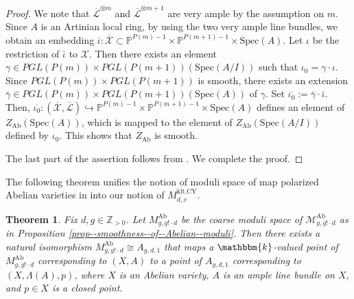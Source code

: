\documentclass[12pt,twoside]{amsart}
\newtheorem{thm}{Theorem}[section]
\theoremstyle{definition}
\begin{document}
\begin{proof}
We note that $\overline{\mathcal{L}}^{\otimes m}$ and $\overline{\mathcal{L}}^{\otimes m+1}$ are very ample by the assumption on $m$.
Since $A$ is an Artinian local ring, by using the two very ample line bundles, we obtain an embedding $\bar{\iota}\colon\overline{\mathcal{X}}\subset \mathbb{P}^{P(m)-1}\times\mathbb{P}^{P(m+1)-1}\times\mathrm{Spec}(A)$.
Let $\iota$ be the restriction of $\bar{\iota}$ to $\mathcal{X}$. 
Then there exists an element $\gamma\in PGL(P(m))\times PGL(P(m+1))(\mathrm{Spec}(A/I))$ such that $\iota_0=\gamma\cdot \iota$.
Since $PGL(P(m))\times PGL(P(m+1))$ is smooth, there exists an extension $\bar{\gamma}\in PGL(P(m))\times PGL(P(m+1))(\mathrm{Spec}(A))$ of $\gamma$.
Set $\overline{\iota_0}:=\bar{\gamma}\cdot \bar{\iota}$.
Then, $\overline{\iota_0}\colon(\overline{\mathcal{X}},\overline{\mathcal{L}})\hookrightarrow\mathbb{P}^{P(m)-1}\times\mathbb{P}^{P(m+1)-1}\times \mathrm{Spec}(A)$ defines an element of $Z_{\mathrm{Ab}}(\mathrm{Spec}(A))$, which is mapped to the element of $Z_{\mathrm{Ab}}(\mathrm{Spec}(A/I))$ defined by $\iota_0$.
This shows that $Z_{\mathrm{Ab}}$ is smooth.

The last part of the assertion follows from \cite[Theorem 11.3.1]{Ols}.
We complete the proof.
\end{proof}

The following theorem unifies the notion of moduli space of map polarized Abelian varieties in \cite{GIT} into our notion of $M^{\text{klt,CY}}_{d,v}$.

\begin{thm}\label{thm--abelian--analytic}
Fix $d,g\in\mathbb{Z}_{>0}$.
Let $M^{\mathrm{Ab}}_{g,g!\cdot d}$ be the coarse moduli space of $\mathcal{M}^{\mathrm{Ab}}_{g,g!\cdot d}$ as in Proposition \ref{prop--smoothness--of--Abelian--moduli}.
Then there exists a natural isomorphism $M^{\mathrm{Ab}}_{g,g!\cdot d}\cong A_{g,d,1}$ that maps a $\mathbbm{k}$-valued point of $M^{\mathrm{Ab}}_{g,g!\cdot d}$ corresponding to $(X,A)$ to a point of $A_{g,d,1}$ corresponding to $(X,\Lambda(A),p)$, where $X$ is an Abelian variety, $A$ is an ample line bundle on $X$, and $p\in X$ is a closed point.
\end{thm}
\end{document}
